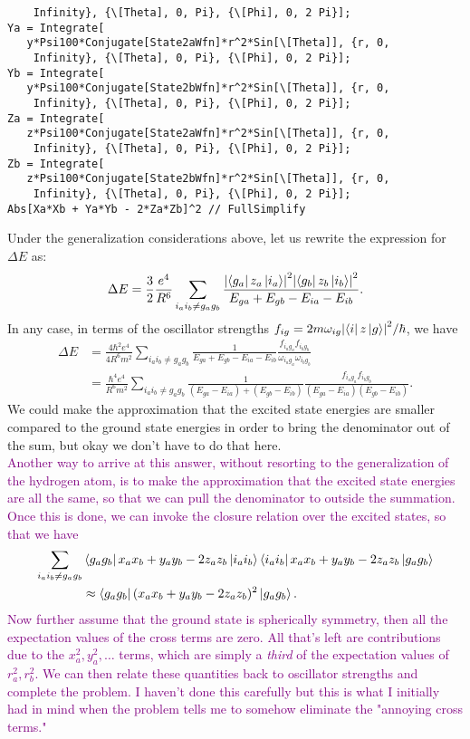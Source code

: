 \documentclass{article}
\theoremstyle{definition}
\newcommand{\f}[2]{\frac{#1}{#2}}
\begin{document}
\begin{enumerate}[label=(\alph*)]
\begin{lstlisting}
    Infinity}, {\[Theta], 0, Pi}, {\[Phi], 0, 2 Pi}];
Ya = Integrate[
   y*Psi100*Conjugate[State2aWfn]*r^2*Sin[\[Theta]], {r, 0, 
    Infinity}, {\[Theta], 0, Pi}, {\[Phi], 0, 2 Pi}];
Yb = Integrate[
   y*Psi100*Conjugate[State2bWfn]*r^2*Sin[\[Theta]], {r, 0, 
    Infinity}, {\[Theta], 0, Pi}, {\[Phi], 0, 2 Pi}];
Za = Integrate[
   z*Psi100*Conjugate[State2aWfn]*r^2*Sin[\[Theta]], {r, 0, 
    Infinity}, {\[Theta], 0, Pi}, {\[Phi], 0, 2 Pi}];
Zb = Integrate[
   z*Psi100*Conjugate[State2bWfn]*r^2*Sin[\[Theta]], {r, 0, 
    Infinity}, {\[Theta], 0, Pi}, {\[Phi], 0, 2 Pi}];
Abs[Xa*Xb + Ya*Yb - 2*Za*Zb]^2 // FullSimplify
\end{lstlisting}

Under the generalization considerations above, let us rewrite the expression for $\Delta E$ as:
\begin{align*}
\Delta E = \f{3}{2}\f{e^4}{R^6} \sum_{i_ai_b \neq g_a g_b} \f{  \abs{\bra{g_a} z_a \ket{i_a}}^2  \abs{\bra{g_b} z_b \ket{i_b}}^2 }{E_{ga} + E_{gb} - E_{ia} - E_{ib}}.
\end{align*}
In any case, in terms of the oscillator strengths $f_{ig} = 2 m \omega_{ig} \abs{ \bra{i} z \ket{g}}^2 / \hbar $, we have
\begin{align*}
\Delta E 
&= \f{4 \hbar^2  e^4 }{4 R^6 m^2 } \sum_{i_a i_b \neq g_a g_b} 
\f{1}{E_{ga} + E_{gb} - E_{ia} - E_{ib}} \f{ f_{i_a g_a} f_{i_bg_b}}{  \omega_{i_a g_a} \omega_{i_b g_b}} \\
&= \f{\hbar^4 e^4 }{R^6 m^2} \sum_{i_a i_b \neq g_a g_b} 
\f{1}{ (E_{ga} - E_{ia}) + (E_{gb} - E_{ib})} \f{ f_{i_a g_a} f_{i_bg_b}}{  (E_{ga} - E_{ia}) (E_{gb} - E_{ib})}.
\end{align*}
We could make the approximation that the excited state energies are smaller compared to the ground state energies in order to bring the denominator out of the sum, but okay we don't have to do that here. \\


\textcolor{purple}{Another way to arrive at this answer, without resorting to the generalization of the hydrogen atom, is to make the approximation that the excited state energies are all the same, so that we can pull the denominator to outside the summation. Once this is done, we can invoke the closure relation over the excited states, so that we have
\begin{align*}
\sum_{i_a i_b \neq g_a g_b}
&\bra{g_a g_b}  x_a x_b + y_a y_b - 2 z_a z_b   \ket{i_a i_b}   
 \bra{i_a i_b}  x_a x_b + y_a y_b - 2 z_a z_b  \ket{g_a g_b}   \\
&\approx \bra{g_a g_b} (x_a x_b + y_a y_b - 2z_a z_b)^2 \ket{g_a g_b}.
\end{align*}
Now further assume that the ground state is spherically symmetry, then all the expectation values of the cross terms are zero. All that's left are contributions due to the $x_a^2, y_a^2,\dots$ terms, which are simply a \textit{third} of the expectation values of $r^2_a, r_b^2$. We can then relate these quantities back to oscillator strengths and complete the problem. I haven't done this carefully but this is what I initially had in mind when the problem tells me to somehow eliminate the "annoying cross terms."
}



\end{enumerate}
\end{document}
